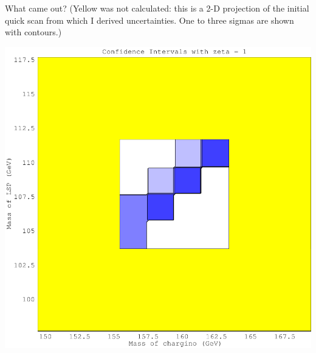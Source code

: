 \documentclass[landscape]{article}
\begin{document}
\pagebreak

What came out?  (Yellow was not calculated: this is a 2-D projection of the initial quick scan from which I derived uncertainties.  One to three sigmas are shown with contours.)

\vfill

\begin{center}\includegraphics[width=0.7\linewidth]{fakeit2_chisquare_tmpbowl2.pdf}\end{center}
\end{document}
